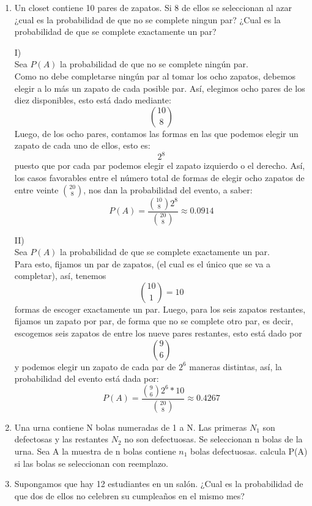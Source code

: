 \documentclass[12pt,a4paper]{report}
\begin{document}
\begin{enumerate}
  \item{
	Un closet contiene 10 pares de zapatos. Si 8 de ellos se seleccionan al
	azar ¿cual es la probabilidad de que no se complete ningun par? ¿Cual es la
	probabilidad de que se complete exactamente un par?

	I)\\
	Sea $P(A)$ la probabilidad de que no se complete ningún par.\\
	Como no debe completarse ningún par al tomar los ocho zapatos, debemos
	elegir a lo más un zapato de cada posible par. Así, elegimos ocho pares de
	los diez disponibles, esto está dado mediante:
		$${10}\choose{8}$$
	Luego, de los ocho pares, contamos las formas en las que podemos elegir un
	zapato de cada uno de ellos, esto es:
		$$2^8$$
	puesto que por cada par podemos elegir el zapato izquierdo o el derecho.
	Así, los casos favorables entre el número total de formas de elegir
	ocho zapatos de entre veinte ${20}\choose{8}$, nos dan la probabilidad del
	evento, a saber:
		$$P(A) = \frac{ {10 \choose 8} 2^8 }{ {20 \choose 8} } \approx 0.0914 $$

	II)\\
	Sea $P(A)$ la probabilidad de que se complete exactamente un par.\\
	Para esto, fijamos un par de zapatos, (el cual es el único que se va a
	completar), así, tenemos
		$${10 \choose 1} = 10$$
	formas de escoger exactamente un par.
	Luego, para los seis zapatos restantes, fijamos un zapato por par, de forma
	que no se complete otro par, es decir, escogemos seis zapatos de entre los
	nueve pares restantes, esto está dado por
		$${9}\choose{6}$$
	y podemos elegir un zapato de cada par de $2^6$ maneras distintas, así, la
	probabilidad del evento está dada por:
		$$P(A) = \frac{ {9 \choose 6} 2^6 * 10}{ {20 \choose 8} } \approx 0.4267 $$
  }

  \item{
	Una urna contiene N  bolas numeradas de 1 a N. Las primeras $N_{1}$ son defectosas y las restantes $N_{2}$ no son defectuosas. Se seleccionan n bolas de la urna. Sea A la muestra de n bolas contiene $n_{1}$ bolas defectuosas. calcula P(A) si las bolas se seleccionan con reemplazo.
  }

  \item{
	Supongamos que hay 12 estudiantes en un salón. ¿Cual es la probabilidad de
	que dos de ellos no celebren su cumpleaños en el mismo mes?\\

}
\end{enumerate}
\end{document}
